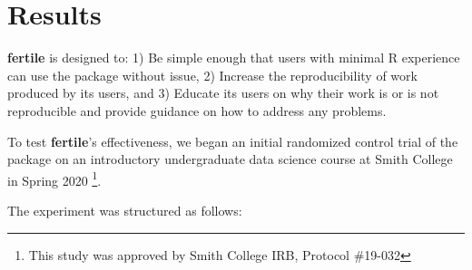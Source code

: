 \documentclass[APA,LATO1COL]{WileyNJD-v2}\usepackage[]{graphicx}\usepackage[]{color}
\newcommand{\R}{\textsf{R}\xspace}
\newcommand{\pkg}[1]{\textbf{#1}}
\begin{document}
\section{Results}

\pkg{fertile} is designed to: 1) Be simple enough that users with minimal \R experience can use the package without issue, 2) Increase the reproducibility of work produced by its users, and 3) Educate its users on why their work is or is not reproducible and provide guidance on how to address any problems.

To test \pkg{fertile}'s effectiveness, we began an initial randomized control trial of the package on an introductory undergraduate data science course at Smith College in Spring 2020 \footnote{This study was approved by Smith College IRB, Protocol \#19-032}.

The experiment was structured as follows:
\end{document}
